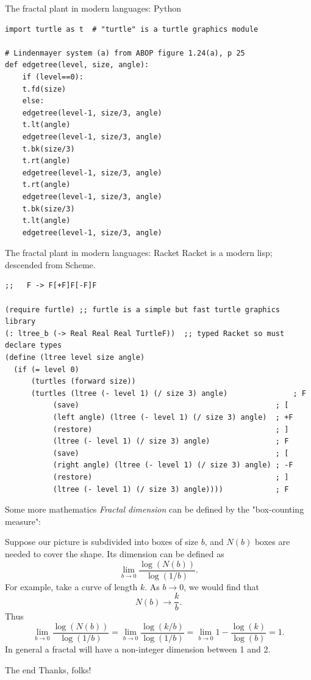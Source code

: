 \documentclass[bigger]{beamer}
\begin{document}
\begin{frame}[fragile,label={sec:org978a91e}]{The fractal plant in modern languages: Python}
 \lstset{language=Python,label= ,caption= ,captionpos=b,numbers=none}
\begin{lstlisting}
import turtle as t  # "turtle" is a turtle graphics module

# Lindenmayer system (a) from ABOP figure 1.24(a), p 25
def edgetree(level, size, angle):
    if (level==0):
	t.fd(size)
    else:
	edgetree(level-1, size/3, angle)
	t.lt(angle)
	edgetree(level-1, size/3, angle)
	t.bk(size/3)
	t.rt(angle)
	edgetree(level-1, size/3, angle)
	t.rt(angle)
	edgetree(level-1, size/3, angle)
	t.bk(size/3)
	t.lt(angle)
	edgetree(level-1, size/3, angle)
\end{lstlisting}
\end{frame}

\begin{frame}[fragile,label={sec:org456ab0c}]{The fractal plant in modern languages: Racket}
 Racket is a modern lisp; descended from Scheme.
\lstset{language=Scheme,label= ,caption= ,captionpos=b,numbers=none}
\begin{lstlisting}
;;   F -> F[+F]F[-F]F

(require furtle) ;; furtle is a simple but fast turtle graphics library
(: ltree_b (-> Real Real Real TurtleF))  ;; typed Racket so must declare types
(define (ltree level size angle)
  (if (= level 0)
      (turtles (forward size))
      (turtles (ltree (- level 1) (/ size 3) angle)               ; F
	       (save)                                             ; [
	       (left angle) (ltree (- level 1) (/ size 3) angle)  ; +F
	       (restore)                                          ; ]
	       (ltree (- level 1) (/ size 3) angle)               ; F 
	       (save)                                             ; [
	       (right angle) (ltree (- level 1) (/ size 3) angle) ; -F
	       (restore)                                          ; ]
	       (ltree (- level 1) (/ size 3) angle))))            ; F
\end{lstlisting}
\end{frame}

\begin{frame}[label={sec:org9473a8b}]{Some more mathematics}
\emph{Fractal dimension} can be defined by the "box-counting measure":

Suppose our picture is subdivided into boxes of size \(b\), and \(N(b)\) boxes 
are needed to cover the shape.  Its dimension can be defined as
\[
\lim_{b\to 0}\frac{\log(N(b))}{\log(1/b)}.
\]
For example, take a curve of length \(k\). As \(b\to 0\), we would find that
\[
N(b)\to \frac{k}{b}.
\]
Thus
\[
\lim_{b\to 0}\frac{\log(N(b))}{\log(1/b)}=\lim_{b\to 0}\frac{\log(k/b)}{\log(1/b)}
=\lim_{b\to 0}1-\frac{\log(k)}{\log(b)}=1.
\]
In general a fractal will have a non-integer dimension between 1 and 2.
\end{frame}


\begin{frame}[label={sec:orge5060fa}]{The end}
Thanks, folks!
\end{frame}
\end{document}
